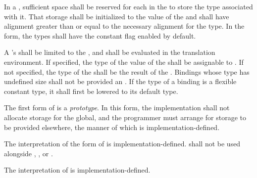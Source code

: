 \specsubsubitem
In a , sufficient space shall be reserved for
each  in the  to store
the type associated with it. That storage shall be initialized to the value of
the  and shall have alignment greater than or equal to
the necessary alignment for the type. In the  form, the types
shall have the constant flag enabled by default.

\specsubsubitem
A 's  shall be limited to
the , and shall be evaluated
in the translation environment. If specified, the type of the value of the
 shall be assignable to . If not
specified, the type of the  shall be the result
of the . Bindings whose type has undefined size shall
not be provided an . If the type of a binding is a
flexible constant type, it shall first be lowered to its default type.

\specsubsubitem
The first form of  is a \textit{prototype}. In this
form, the implementation shall not allocate storage for the global, and the
programmer must arrange for storage to be provided elsewhere, the manner of
which is implementation-defined.

\specsubsubitem
The interpretation of the  form of  is
implementation-defined.  shall not be used alongside
, , or .


\specsubsubitem
The interpretation of  is implementation-defined.



\begin{grammar}
 \\
	  \\

 \\
	 \optional{\terminal{,}} \\
	 \terminal{,}  \\

 \\
	 \terminal{:}  \terminal{=}  \\
	 \terminal{=}  \\
\end{grammar}

